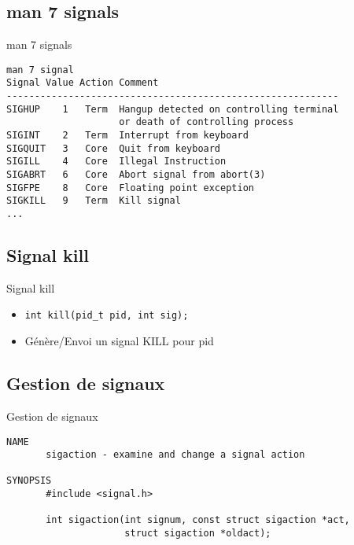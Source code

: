 \begin{frame}[containsverbatim]{\sectitle}
\def\subsectitle{man 7 signals}
\subsection{\subsectitle}
\begin{block}{\subsectitle}
\begin{verbatim}
man 7 signal
Signal Value Action Comment
-----------------------------------------------------------
SIGHUP    1   Term  Hangup detected on controlling terminal
                    or death of controlling process
SIGINT    2   Term  Interrupt from keyboard
SIGQUIT   3   Core  Quit from keyboard
SIGILL    4   Core  Illegal Instruction
SIGABRT   6   Core  Abort signal from abort(3)
SIGFPE    8   Core  Floating point exception
SIGKILL   9   Term  Kill signal
...
\end{verbatim}
\end{block}
\end{frame}


\begin{frame}[containsverbatim]{\sectitle}
\def\subsectitle{Signal kill}
\subsection{\subsectitle}
\begin{block}{\subsectitle}
\begin{itemize}
    \item \texttt{int kill(pid\_t pid, int sig);}
    \item Génère/Envoi un signal KILL pour pid
\end{itemize}
\end{block}

\def\subsectitle{Gestion de signaux}
\subsection{\subsectitle}
\begin{block}{\subsectitle}
\begin{verbatim}
NAME
       sigaction - examine and change a signal action

SYNOPSIS
       #include <signal.h>

       int sigaction(int signum, const struct sigaction *act,
                     struct sigaction *oldact);
\end{verbatim}
\end{block}

\end{frame}


